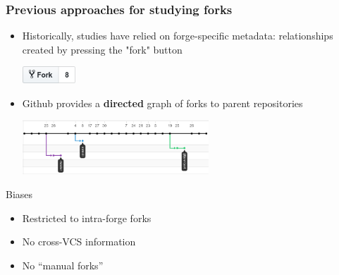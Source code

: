 \documentclass[aspectratio=169,xcolor=table]{beamer}
\begin{document}
    \begin{frame}
        \frametitle{Previous approaches for studying forks}

        \begin{block}{}
            \begin{itemize}
                \item Historically, studies have relied on forge-specific
                    metadata: relationships created by pressing the "fork"
                    button
                    \begin{center}
                        \includegraphics[width=2cm]{img/forkbutton}
                    \end{center}
                \item Github provides a \textbf{directed} graph of forks to parent
                    repositories
                    \begin{center}
                        \includegraphics[width=7cm]{img/forknetwork}
                    \end{center}
            \end{itemize}
        \end{block}

        \begin{block}{Biases}
            \begin{itemize}
                \item Restricted to intra-forge forks
                \item No cross-VCS information
                \item No ``manual forks''
            \end{itemize}
        \end{block}
    \end{frame}
\end{document}
